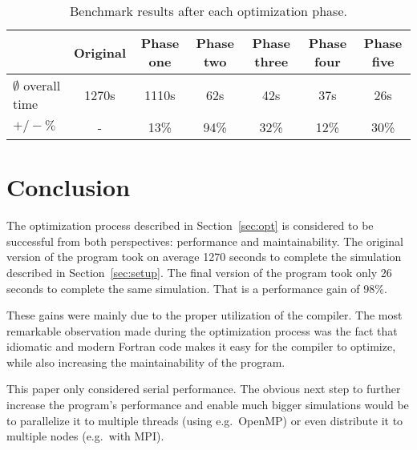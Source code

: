 \documentclass[twoside,11pt]{article}
\begin{document}
\begin{table}
  \begin{tabu}{|X|c|c|c|c|c|c|}
    \hline
      &Original &Phase one &Phase two &Phase three &Phase four
      &Phase five \\
    \hline
    $\emptyset$ overall time &1270s &1110s &62s &42s &37s &26s \\
    \hline
    $+/-\%$ &- &13\% &94\% &32\% &12\% &30\% \\
    \hline
  \end{tabu}
  \caption{Benchmark results after each optimization phase.}
  \label{tab:discussion}
\end{table}


\section{Conclusion} %
\label{sec:con}

The optimization process described in Section~\ref{sec:opt} is
considered to be successful from both perspectives: performance and
maintainability.
The original version of the program took on average 1270 seconds to
complete the simulation described in Section~\ref{sec:setup}.
The final version of the program took only 26 seconds to complete the
same simulation.
That is a performance gain of 98\%.

These gains were mainly due to the proper utilization of the compiler.
The most remarkable observation made during the optimization process
was the fact that idiomatic and modern Fortran code makes it
easy for the compiler to optimize, while also increasing the
maintainability of the program.

This paper only considered serial performance.
The obvious next step to further increase the program's performance
and enable much bigger simulations would be to parallelize it to
multiple threads (using e.g.\ OpenMP) or even distribute it to
multiple nodes (e.g.\ with MPI).



\end{document}
